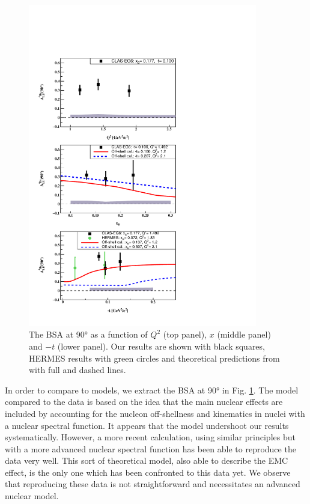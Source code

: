 \documentclass[aps,prc,preprint,superscriptaddress]{revtex4}
\begin{document}
\begin{figure}[tbp]
\center
\includegraphics[width=10cm]{fig3/Coherent_ALU_phi_90.pdf}
\caption{The BSA at 90° as a function of $Q^2$ (top panel), $x$ (middle panel) and $-t$ (lower panel).
	Our results are shown with black squares, HERMES results 
	with green circles \cite{Airapetian:2009cga} and theoretical predictions 
	from \cite{Liuti:2005gi} with full and dashed lines.}
\label{fig:CohALU90}
\end{figure}

In order to compare to models, we extract the BSA at 90° in Fig. \ref{fig:CohALU90}. The model 
compared to the data \cite{Liuti:2005gi} is based on the idea that the main nuclear effects are 
included by accounting for the nucleon off-shellness and kinematics in nuclei with a nuclear
spectral function. It appears that the model undershoot our results systematically. However, 
a more recent calculation, using similar principles but with a more advanced nuclear spectral 
function \cite{Fucini:2018gso} has been able to reproduce the data very well. This 
sort of theoretical model, also able to describe the EMC effect, is the only one which has 
been confronted to this data yet. We observe that reproducing these data is not 
straightforward and necessitates an advanced nuclear model.
\end{document}
